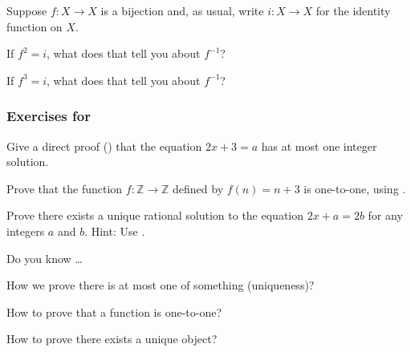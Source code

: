 \begin{exer}[\exerE] %
\label{exer_inverses_of_finite_order_fns}
    Suppose $f:X \to X$ is a bijection and, as usual, write $i:X \to X$ for the identity function on $X$.
\begin{exerpart}
    \item If $f^2=i$, what does that tell you about $f^{-1}$?
    \item If $f^3=i$, what does that tell you about $f^{-1}$?
\end{exerpart}
\end{exer}


\subsubsection*{Exercises for  \subpffunique}

\begin{exer}[\exerP] %
\label{exer_direct_unique}
    Give a direct proof () that the equation $2x+3=a$ has at most one integer solution.
\end{exer}

\begin{exer}[\exerP] %
\label{exer_proof_onetoone}
    Prove that the function $f: \mathbb{Z} \to \mathbb{Z}$ defined by $f(n) = n+ 3$ is one-to-one, using .
\end{exer}

\begin{exer}{\exerU} %
\label{exer_prove_uniq_soln}
    Prove there exists a unique rational solution to the equation $2x + a = 2b$ for any integers $a$ and $b$.  Hint: Use .
\end{exer}

\begin{exer}[\exerR] %
\label{exer_dyk_pff_unique}
    Do you know \ldots
        \begin{exerpart}
            \item How we prove there is at most one of something (uniqueness)?
            \item How to prove that a function is one-to-one?
            \item How to prove there exists a unique object? 
        \end{exerpart}
\end{exer}

